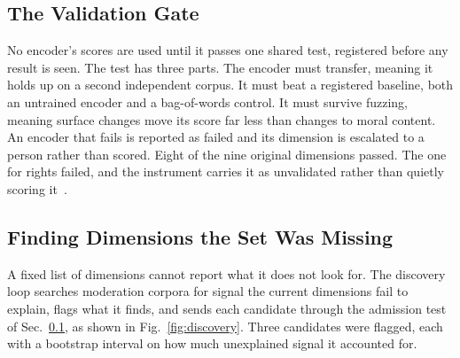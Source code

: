 \documentclass[journal]{IEEEtran}
\begin{document}
\subsection{The Validation Gate}
\label{sec:gate}

No encoder's scores are used until it passes one shared test, registered
before any result is seen. The test has three parts. The encoder must
transfer, meaning it holds up on a second independent corpus. It must beat a
registered baseline, both an untrained encoder and a bag-of-words control. It
must survive fuzzing, meaning surface changes move its score far less than
changes to moral content. An encoder that fails is reported as failed and its
dimension is escalated to a person rather than scored. Eight of the nine
original dimensions passed. The one for rights failed, and the instrument
carries it as unvalidated rather than quietly scoring it~\cite{xbse}.

\subsection{Finding Dimensions the Set Was Missing}
\label{sec:discovery}

A fixed list of dimensions cannot report what it does not look for. The
discovery loop searches moderation corpora for signal the current dimensions
fail to explain, flags what it finds, and sends each candidate through the
admission test of Sec.~\ref{sec:gate}, as shown in
Fig.~\ref{fig:discovery}. Three candidates were flagged, each with a
bootstrap interval on how much unexplained signal it accounted for.
\end{document}
